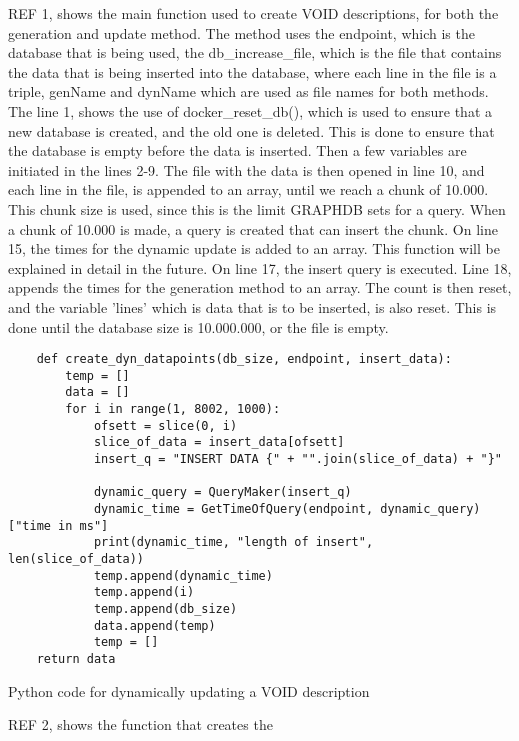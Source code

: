 REF 1, shows the main function used to create VOID descriptions, for both the generation and update method. The method uses the endpoint, which is the database that is being used, the db\_increase\_file, which is the file that contains the data that is being inserted into the database, where each line in the file is a triple, genName and dynName which are used as file names for both methods.
The line 1, shows the use of docker\_reset\_db(), which is used to ensure that a new database is created, and the old one is deleted. This is done to ensure that the database is empty before the data is inserted. Then a few variables are initiated in the lines 2-9. The file with the data is then opened in line 10, and each line in the file, is appended to an array, until we reach a chunk of 10.000. This chunk size is used, since this is the limit GRAPHDB sets for a query. When a chunk of 10.000 is made, a query is created that can insert the chunk. On line 15, the times for the dynamic update is added to an array. This function will be explained in detail in the future. On line 17, the insert query is executed. Line 18, appends the times for the generation method to an array. The count is then reset, and the variable 'lines' which is data that is to be inserted, is also reset. This is done until the database size is 10.000.000, or the file is empty.

\begin{listing}[htb!]
    \begin{verbatim}
    def create_dyn_datapoints(db_size, endpoint, insert_data):
        temp = []
        data = []
        for i in range(1, 8002, 1000):
            ofsett = slice(0, i)
            slice_of_data = insert_data[ofsett]
            insert_q = "INSERT DATA {" + "".join(slice_of_data) + "}"

            dynamic_query = QueryMaker(insert_q)
            dynamic_time = GetTimeOfQuery(endpoint, dynamic_query)["time in ms"]
            print(dynamic_time, "length of insert", len(slice_of_data))
            temp.append(dynamic_time)
            temp.append(i)
            temp.append(db_size)
            data.append(temp)
            temp = []
    return data
    \end{verbatim}
    \caption{Python code for dynamically updating a VOID description}
    \label{lst:create_dyn_datapoints}
\end{listing}

REF 2, shows the function that creates the



